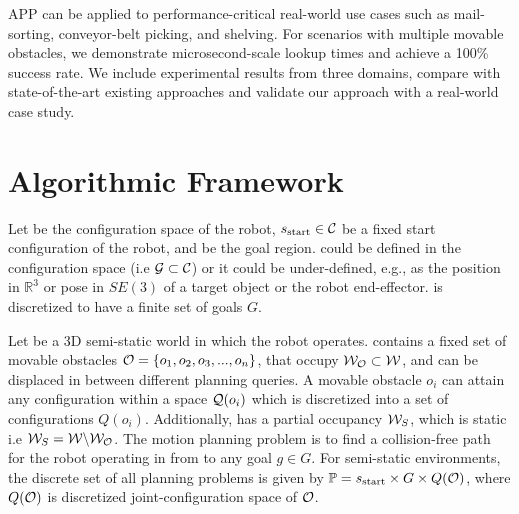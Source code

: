 \documentclass[a4paper]{report}
\begin{document}
APP can be applied to performance-critical real-world use cases such as mail-sorting, conveyor-belt picking, and shelving. 
For scenarios with multiple movable obstacles, we demonstrate microsecond-scale lookup times and achieve a 100\% success rate. We include experimental results from three domains, compare with state-of-the-art existing approaches and validate our approach with a real-world case study. 

\section{Algorithmic Framework}
\label{subsec:setup}
Let \calC be the configuration space of the robot, $s_{\textrm{start}} \in \mathcal{C}$ be a fixed start configuration of the robot, and \calG be the goal region. 
\calG could be defined in the configuration space \calC (i.e $\mathcal{G} \subset \mathcal{C}$) or it could be under-defined, e.g., as the position in $\mathbb{R}^3$ or pose in $SE(3)$ of a target object or the robot end-effector. \calG is discretized to have a finite set of goals $G$. 

Let \calW be a 3D semi-static world in which the robot operates. \calW contains a fixed set of movable obstacles $\mathcal{O} = \{o_1, o_2, o_3,...,o_n\}$, that occupy $\mathcal{W}_\mathcal{O} \subset \mathcal{W}$, and can be displaced in between different planning queries. A movable obstacle $o_i$ can attain any configuration within a space $\mathcal{Q}(o_i)$ which is discretized into a set of configurations $Q(o_i)$. Additionally, \calW has a partial occupancy $\mathcal{W}_S$, which is static i.e $\mathcal{W}_S = \mathcal{W} \backslash \mathcal{W}_\mathcal{O}$. The motion planning problem is to find a collision-free path for the robot operating in \calW from \Sstart to any goal $g \in G$.
For semi-static environments, the discrete set of all planning problems is given by $\mathbb{P} = s_{\textrm{start}} \times G \times Q(\mathcal{O})$, where $Q(\mathcal{O})$ is discretized joint-configuration space of $\mathcal{O}$.

\end{document}
